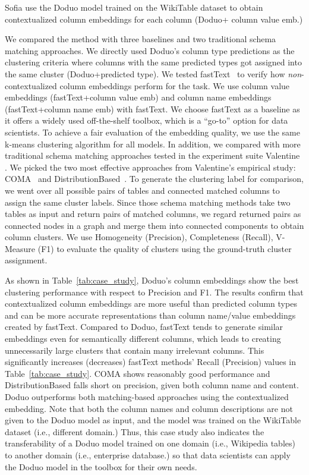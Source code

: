 \documentclass[sigconf]{acmart}
\newcommand{\name}{\mbox{\sc Doduo}}
\newcommand{\rev}[1]{#1}
\newcommand{\revcr}[1]{#1}
\begin{document}
{Sofia use the \name{} model trained on the WikiTable dataset to obtain contextualized column embeddings for each column (\name + column value emb.) 
%

We compared the method with three baselines and \rev{two traditional schema matching approaches}. We directly used \name's column type predictions as the clustering criteria where columns with the same predicted types got assigned into the same cluster (\name+predicted type).
%
We tested fastText~\cite{bojanowski2016enriching} to verify how {\em non}-contextualized column embeddings perform for the task. We use column value embeddings (fastText+column value emb) and column name embeddings (fastText+column name emb) with fastText. We choose fastText as a baseline as it offers a widely used off-the-shelf toolbox, which is a ``go-to'' option for data scientists. 
%
%
To achieve a fair evaluation of the embedding quality, we use the same k-means clustering algorithm for all models.
%
\rev{In addition, we compared with more traditional schema matching approaches tested in the experiment suite Valentine \cite{koutras2021valentine}. We picked the two most effective approaches from Valentine's empirical study: COMA~\cite{do2002coma} and DistributionBased~\cite{zhang2011automatic}. To generate the clustering label for comparison, we went over all possible pairs of tables and connected matched columns to assign the same cluster labels.} 
%
\revcr{Since those schema matching methods take two tables as input and return pairs of matched columns, we regard returned pairs as connected nodes in a graph and merge them into connected components to obtain column clusters.}
%
We use Homogeneity (Precision), Completeness (Recall), V-Measure (F1) to evaluate the quality of clusters using the ground-truth cluster assignment.

As shown in Table~\ref{tab:case_study}, \name's column embeddings show the best clustering performance with respect to Precision and F1. The results confirm that contextualized column embeddings are more useful than predicted column types and can be more accurate representations than column name/value embeddings created by fastText.
%
Compared to \name, fastText tends to generate similar embeddings even for semantically different columns, which leads to creating unnecessarily large clusters that contain many irrelevant columns. This significantly increases (decreases) fastText methods' Recall (Precision) values in Table~\ref{tab:case_study}.
\rev{COMA shows reasonably good performance and DistributionBased falls short on precision, given both column name and content. \name{} outperforms both matching-based approaches using the contextualized embedding.}
%
Note that both the column names and column descriptions are not given to the \name{} model as input, and the model was trained on the WikiTable dataset (i.e., different domain.)
%
Thus, this case study also indicates the transferability of a \name{} model trained on one domain (i.e., Wikipedia tables) to another domain (i.e., enterprise database.) so that data scientists can apply the \name{} model in the toolbox for their own needs.}
\end{document}
